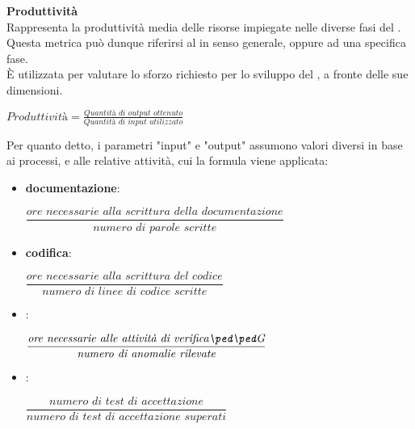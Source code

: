 \textbf{Produttività}\\

Rappresenta la produttività media delle risorse impiegate nelle diverse fasi del . Questa metrica può dunque riferirsi al  in senso generale, oppure ad una specifica fase.\\ \`E utilizzata per valutare lo sforzo richiesto per lo sviluppo del , a fronte delle sue dimensioni.
\begin{center}
\begin{math}
	\textit{Produttività} = \frac	{\textit{Quantità di output ottenuto}}
									{\textit{Quantità di input utilizzato}}
\end{math}
\end{center}
Per quanto detto, i parametri "input" e "output" assumono valori diversi in base ai processi, e alle relative attività, cui la formula viene applicata:
\begin{itemize}
	\item \textbf{documentazione}:
	\begin{center} 
		\begin{math}
			\dfrac	{\textit{ore necessarie alla scrittura della documentazione}}
					{\textit{numero di parole scritte}}
		\end{math}
	\end{center}	
	\item \textbf{codifica}:
	\begin{center} 
		\begin{math}
			\dfrac	{\textit{ore necessarie alla scrittura del codice}}
					{\textit{numero di linee di codice scritte}}
		\end{math}
	\end{center}	
	\item \textbf{}:
	\begin{center} 
		\begin{math}
			\dfrac	{\textit{ore necessarie alle attivit\`a di \glossaryItem{verifica}}}
					{\textit{numero di anomalie rilevate}}
		\end{math}
	\end{center}		
	\item \textbf{}: 
	\begin{center}
		\begin{math}
			\dfrac	{\textit{numero di test di accettazione}}
					{\textit{numero di test di accettazione superati}}
		\end{math}
	\end{center}		
\end{itemize}

